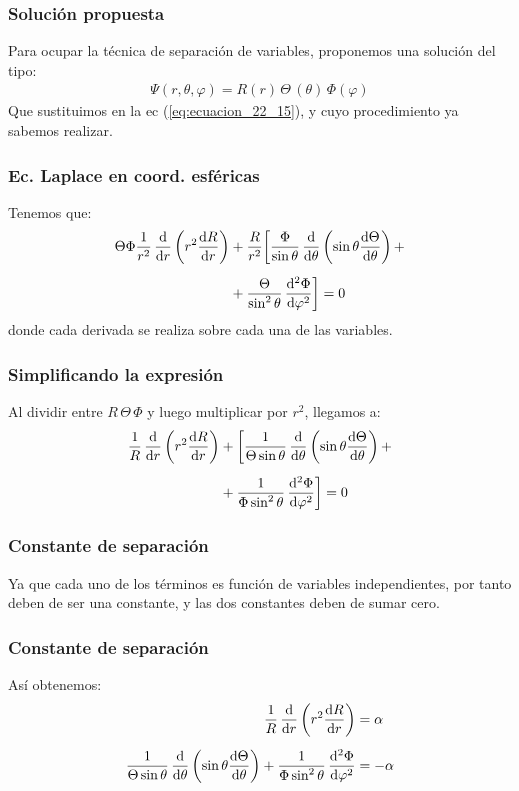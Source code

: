 \documentclass[12pt]{beamer}
\begin{document}
\begin{frame}
\frametitle{Solución propuesta}
Para ocupar la técnica de separación de variables, proponemos una solución del tipo:
\pause
\begin{align*}
\Psi(r, \theta, \varphi) = R(r) \, \Theta \, (\theta) \, \Phi(\varphi)
\end{align*}
Que sustituimos en la ec (\ref{eq:ecuacion_22_15}), y cuyo procedimiento ya sabemos realizar.
\end{frame}
\begin{frame}
\frametitle{Ec. Laplace en coord. esféricas}
Tenemos que:
\pause
\begin{align*}
\Theta \Phi \dfrac{1}{r^{2}} \, \dv{r} \left( r^{2} \dv{R}{r} \right) &+ \dfrac{R}{r^{2}} \bigg[ \dfrac{\Phi}{\sin \theta} \, \dv{\theta} \left( \sin \theta \dv{\Theta}{\theta} \right) + \\[0.5em]
&+ \dfrac{\Theta}{\sin^{2} \theta} \, \dv[2]{\Phi}{\varphi} \bigg] = 0
\end{align*}
donde cada derivada se realiza sobre cada una de las variables.
\end{frame}
\begin{frame}
\frametitle{Simplificando la expresión}
Al dividir entre $R \, \Theta \, \Phi$ y luego multiplicar por $r^{2}$, llegamos a:
\pause
\begin{align*}
\dfrac{1}{R} \, \dv{r} \left( r^{2} \dv{R}{r} \right) &+ \bigg[ \dfrac{1}{\Theta \sin \theta} \, \dv{\theta} \left( \sin \theta \dv{\Theta}{\theta} \right) + \\[0.5em]
&+ \dfrac{1}{\Phi \sin^{2} \theta} \, \dv[2]{\Phi}{\varphi} \bigg] = 0
\end{align*}
\end{frame}
\begin{frame}
\frametitle{Constante de separación}
Ya que cada uno de los términos es función de variables independientes, por tanto deben de ser una constante, y las dos constantes deben de sumar cero.
\end{frame}
\begin{frame}
\frametitle{Constante de separación}
Así obtenemos:
\pause
\begin{align*}
\dfrac{1}{R} \, \dv{r} \left( r^{2} \dv{R}{r} \right) &= \alpha \\[0.5em]
\dfrac{1}{\Theta \sin \theta} \, \dv{\theta} \left( \sin \theta \dv{\Theta}{\theta} \right) + \dfrac{1}{\Phi \sin^{2} \theta} \, \dv[2]{\Phi}{\varphi} &= - \alpha
\end{align*}
\end{frame}
\end{document}

